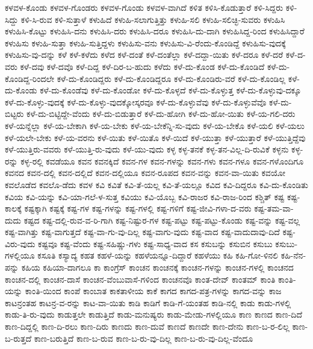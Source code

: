 {ಕಳವಳ-ಕೊಂಡು
ಕಳವಳ-ಗೊಂಡರು
ಕಳವಳ-ಗೊಂಡು
ಕಳವಳ-ವಾಗಿದೆ
ಕಳಿತ
ಕಳಿಸಿ-ಕೊಡುತ್ತಾರೆ
ಕಳಿ-ಸಿದ್ದರು
ಕಳಿ-ಸಿದ್ದು
ಕಳಿ-ಸಿ-ರುವ
ಕಳಿ-ಸುತ್ತಾಳೆ
ಕಳುಹಿದೆ
ಕಳುಹಿ-ಸಲಾಗುತ್ತಿತ್ತು
ಕಳುಹಿ-ಸಲಿ
ಕಳುಹಿ-ಸಲಿಚ್ಛಿ-ಸುವರು
ಕಳುಹಿಸಿ
ಕಳುಹಿಸಿ-ಕೊಟ್ಟು
ಕಳುಹಿಸಿ-ದನು
ಕಳುಹಿಸಿ-ದರು
ಕಳುಹಿಸಿ-ದರೂ
ಕಳುಹಿಸಿ-ದು-ದಾಗಿ
ಕಳುಹಿಸಿದ್ದ-ರಿಂದ
ಕಳುಹಿಸಿದ್ದಾರೆ
ಕಳುಹಿಸು
ಕಳುಹಿ-ಸುತ್ತಾ
ಕಳುಹಿ-ಸುತ್ತಿದ್ದಳು
ಕಳುಹಿಸು-ವನು
ಕಳುಹಿಸು-ವಿ-ರೆಂದು-ಕೊಂಡಿದ್ದೆ
ಕಳುಹಿಸು-ವುದಕ್ಕೆ
ಕಳುಹಿಸು-ವು-ದನ್ನು
ಕಳೆ
ಕಳೆ-ಕಳೆದು
ಕಳೆದ
ಕಳೆ-ದಂತೆ
ಕಳೆ-ದಂತೆಲ್ಲಾ
ಕಳೆ-ದದ್ದಾ-ಯಿತು
ಕಳೆ-ದರೂ
ಕಳೆ-ದರೆ
ಕಳೆ-ದ-ವರು
ಕಳೆ-ದವು
ಕಳೆ-ದವೊ
ಕಳೆ-ದಿದ್ದ
ಕಳೆ-ದಿರ-ಬ-ಹುದು
ಕಳೆದು
ಕಳೆ-ದು-ಕೊಂಡ
ಕಳೆ-ದು-ಕೊಂಡಿದೆ
ಕಳೆ-ದು-ಕೊಂಡಿದ್ದ-ರಿಂದಲೇ
ಕಳೆ-ದು-ಕೊಂಡಿದ್ದರು
ಕಳೆ-ದು-ಕೊಂಡಿದ್ದರೂ
ಕಳೆ-ದು-ಕೊಂಡಿರು-ವರೆ
ಕಳೆ-ದು-ಕೊಂಡಿಲ್ಲ
ಕಳೆ-ದು-ಕೊಂಡು
ಕಳೆ-ದು-ಕೊಂಡೆವು
ಕಳೆ-ದು-ಕೊಂಡೋ
ಕಳೆ-ದು-ಕೊಳ್ಳದೆ
ಕಳೆ-ದು-ಕೊಳ್ಳುತ್ತ
ಕಳೆ-ದು-ಕೊಳ್ಳುವು-ದಕ್ಕೂ
ಕಳೆ-ದು-ಕೊಳ್ಳು-ವುದಕ್ಕೆ
ಕಳೆ-ದು-ಕೊಳ್ಳು-ವುದಕ್ಕೋಸ್ಕರವೂ
ಕಳೆ-ದು-ಕೊಳ್ಳುವೆವು
ಕಳೆ-ದು-ಕೊಳ್ಳುವೆವೊ
ಕಳೆ-ದು-ಬಿಟ್ಟರು
ಕಳೆ-ದು-ಬಿಟ್ಟಿದ್ದೇ-ವೆಂದು
ಕಳೆ-ದು-ಬಿಡುತ್ತಾರೆ
ಕಳೆ-ದು-ಹೋಗಿ
ಕಳೆ-ದು-ಹೋ-ಯಿತು
ಕಳೆ-ಯ-ಗಲಿ-ದರು
ಕಳೆ-ಯನ್ನೆಲ್ಲಾ
ಕಳೆ-ಯ-ಬೇಕಾಗಿ
ಕಳೆ-ಯ-ಬೇಕು
ಕಳೆ-ಯ-ಬೇಕೆನ್ನಿ-ಸು-ವುದು
ಕಳೆ-ಯ-ಬೇಕೊ
ಕಳೆ-ಯಲಿ
ಕಳೆ-ಯಲು
ಕಳೆ-ಯಲೇ-ಬೇಕು
ಕಳೆ-ಯ-ವರನು
ಕಳೆ-ಯಿತು
ಕಳೆ-ಯಿತೊ
ಕಳೆ-ಯಿದೆ
ಕಳೆ-ಯುತ್ತಾ
ಕಳೆ-ಯುತ್ತಾರೆ
ಕಳೆ-ಯುತ್ತಿದ್ದೆವು
ಕಳೆ-ಯುತ್ತಿರು-ವವರು
ಕಳೆ-ಯುತ್ತಿ-ರು-ವುದು
ಕಳೆ-ಯು-ವುದು
ಕಳ್ಳ
ಕಳ್ಳ-ತನಕೆ
ಕಳ್ಳ-ತನ-ವಿಲ್ಲ-ದಿ-ರುವಿಕೆ
ಕಳ್ಳನು
ಕಳ್ಳ-ರನ್ನು
ಕಳ್ಳ-ರಲ್ಲಿ
ಕವಡೆಯೂ
ಕವನ
ಕವನಕ್ಕಿದೆ
ಕವನ-ಗಳ
ಕವನ-ಗಳನ್ನು
ಕವನ-ಗಳು
ಕವನ-ಗಳೂ
ಕವನ-ಗಳೊಂದಿಗೂ
ಕವನದ
ಕವನ-ದಲ್ಲಿ
ಕವನ-ದಲ್ಲಿದೆ
ಕವನ-ದಲ್ಲಿಯೂ
ಕವನ-ರೂಪದ
ಕವನ-ವನ್ನು
ಕವನ-ವಾ-ಯಿತು
ಕವಯೋ
ಕವಲೊಡೆದ
ಕವಲೊ-ಡೆದು
ಕವಳ
ಕವಿ
ಕವಿತೆ
ಕವಿ-ತೆ-ಯಲ್ಲ
ಕವಿ-ತೆ-ಯಲ್ಲೂ
ಕವಿದ
ಕವಿ-ದಿದ್ದರೂ
ಕವಿ-ದು-ಕೊಂಡಿತು
ಕವಿಯ
ಕವಿ-ಯನ್ನು
ಕವಿ-ಯಾ-ಗಲೆ-ಳ-ಸುತ್ತ
ಕವಿಯು
ಕವಿ-ಯೊಬ್ಬ
ಕವಿ-ರಾಜರ
ಕವಿ-ರಾಜ-ರಿಂದ
ಕಶ್ಚಿತ್
ಕಷ್ಟ
ಕಷ್ಟ-ಕಾಲಕ್ಕೆ
ಕಷ್ಟಕ್ಕಾಗಿ
ಕಷ್ಟಕ್ಕೆ
ಕಷ್ಟ-ಗಳ
ಕಷ್ಟ-ಗಳನ್ನು
ಕಷ್ಟ-ಗಳಲ್ಲಿ
ಕಷ್ಟ-ಗಳಿಗೆ
ಕಷ್ಟ-ಜೀವಿ-ಗಳಾ-ದ-ವರು
ಕಷ್ಟ-ತಮ-ವಾ-ದುದು
ಕಷ್ಟದ
ಕಷ್ಟ-ದಲ್ಲಿ-ರುವ-ವ-ರಿ-ಗಾಗಿ
ಕಷ್ಟ-ನಿಷ್ಟುರ-ಗಳ
ಕಷ್ಟ-ಪಟ್ಟು
ಕಷ್ಟ-ಪಟ್ಟು-ಕೊಂಡು
ಕಷ್ಟ-ವನ್ನು
ಕಷ್ಟ-ವಲ್ಲ
ಕಷ್ಟ-ವಾಗಿತ್ತು
ಕಷ್ಟ-ವಾಗುತ್ತದೆ
ಕಷ್ಟ-ವಾ-ಗು-ವು-ದಿಲ್ಲ
ಕಷ್ಟ-ವಾಗು-ವುದು
ಕಷ್ಟ-ವಾದ
ಕಷ್ಟ-ವಾದುದಾವು-ದಿದೆ
ಕಷ್ಟ-ವಿರು-ವುದು
ಕಷ್ಟವೂ
ಕಷ್ಟ-ವೆಂದು
ಕಷ್ಟ-ಸಹಿಷ್ಣು-ಗಳು
ಕಷ್ಟ-ಸಾಧ್ಯ-ವಾದ
ಕಸ
ಕಸುಬನ್ನು
ಕಸುಬಿನ
ಕಸುಬು
ಕಸುಬು-ಗಳಲ್ಲಿಯೂ
ಕಸೂತಿ
ಕಸ್ಯಾದ್ಯ
ಕಹತ
ಕಹಳೆ-ಯನ್ನು
ಕಹಳೆಯನ್ನೂ-ದಿದ್ದಾರೆ
ಕಹಳೆಯು
ಕಹಿ
ಕಹಿ-ಗೋ-ಳಿನಲಿ
ಕಹಿ-ನೆನ-ಪನ್ನು
ಕಹಿಯ
ಕಹಿಯಾ-ದಾಗಲೂ
ಕಾ
ಕಾಂಗ್ರೆಸ್
ಕಾಂಚನ
ಕಾಂಚನಕ್ಕೆ
ಕಾಂಚನ-ಗಳನ್ನು
ಕಾಂಚನ-ಗಳಲ್ಲಿ
ಕಾಂಚನದ
ಕಾಂಚನ-ದಲ್ಲಿ
ಕಾಂಚನ-ದಾಸೆ
ಕಾಂಚನ-ವೆಂಬುವಾಸೆ-ಗಳಿಂದ
ಕಾಂಚನವೊ
ಕಾಂತ-ದೇವ್
ಕಾಂತಮ್
ಕಾಂತಿ
ಕಾಂತಿ-ಯನ್ನು
ಕಾಂತಿ-ಯಿಂದ
ಕಾಂಪೆ
ಕಾಂಬಾತ
ಕಾಕತಾಳೀಯ
ಕಾಕೆ
ಕಾಗದ
ಕಾಗದ-ಪತ್ರ-ಗಳನ್ನು
ಕಾಗದ-ವನ್ನು
ಕಾಜ
ಕಾಟನ್ರಂತಹ
ಕಾಟನ್ರ-ವ-ರನ್ನು
ಕಾಟ-ವಾ-ಯಿತು
ಕಾಡಿ
ಕಾಡಿಗೆ
ಕಾಡಿ-ಗೆ-ಯಂತಹ
ಕಾಡಿ-ನಲ್ಲಿ
ಕಾಡು
ಕಾಡು-ಗಳಲ್ಲಿ
ಕಾಡು-ತಿ-ರು-ವುದು
ಕಾಡುತ್ತಲೇ
ಕಾಡುತ್ತಿದೆ
ಕಾಡು-ಮನುಷ್ಯರು
ಕಾಡು-ಮೇಡು-ಗಳಲ್ಲಿಯೂ
ಕಾಣ
ಕಾಣದ
ಕಾಣ-ದಿದೆ
ಕಾಣ-ದಿದ್ದಲ್ಲಿ
ಕಾಣ-ದಿ-ರಲು
ಕಾಣ-ದಿರು
ಕಾಣದು
ಕಾಣ-ದುವೆ
ಕಾಣದೆ
ಕಾಣದೇ
ಕಾಣ-ದೇನು
ಕಾಣ-ಬ-ರ-ಲಿಲ್ಲ
ಕಾಣ-ಬ-ರುತ್ತದೆ
ಕಾಣ-ಬರುತ್ತಿದೆ
ಕಾಣ-ಬ-ರುವ
ಕಾಣ-ಬ-ರು-ವು-ದಿಲ್ಲ
ಕಾಣ-ಬ-ರು-ವು-ದಿಲ್ಲ-ವೆಂದೂ
}

